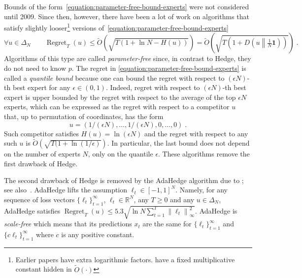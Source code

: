 \documentclass{colt2016} %
\DeclareMathOperator{\Regret}{Regret}
\newcommand{\R}{\mathbb{R}}     %
\newcommand{\KL}[2]{D\left({#1}\middle\|{#2}\right)}  %
\newcommand{\norm}[1]{\left\|{#1}\right\|}
\newcommand{\indicator}{\mathbf{1}}
\begin{document}
Bounds of the form~\eqref{equation:parameter-free-bound-experts} were not
considered until 2009. Since then, however, there have been a lot of work
\citep{Chaudhuri-Freund-Hsu-2009, Chernov-Vovk-2010, Koolen-van-Erven-2015,
Luo-Schapire-2014, Luo-Schapire-2015, Foster-Rakhlin-Sridharan-2015,
Orabona-Pal-2016-parameter-free} on algorithms that satisfy slightly
looser\footnote{Earlier papers have extra logarithmic factors.
\citet{Foster-Rakhlin-Sridharan-2015, Orabona-Pal-2016-parameter-free} have
a fixed multiplicative constant hidden in $\widetilde
O(\cdot)$} versions of~\eqref{equation:parameter-free-bound-experts}
\begin{equation}
\label{equation:parameter-free-bound-experts-2}
\forall u \in \Delta_N \qquad \Regret_T(u) \le \widetilde O(\sqrt{T (1 + \ln N - H(u))}) = \widetilde O\left(\sqrt{T \left(1 + \KL{u}{\tfrac{1}{N}\indicator} \right)} \right) \; .
\end{equation}
Algorithms of this type are called \emph{parameter-free} since, in contrast to
Hedge, they do not need to know $p$. The regret in
\eqref{equation:parameter-free-bound-experts} is called a \emph{quantile bound}
because one can bound the regret with respect to $(\epsilon N)$-th best expert
for any $\epsilon \in (0,1)$. Indeed, regret with respect to $(\epsilon N)$-th
best expert is upper bounded by the regret with respect to the average of the
top $\epsilon N$ experts, which can be expressed as the regret with respect to
a competitor $u$ that, up to permutation of coordinates, has the form
$$
u = \left( 1/(\epsilon N), \dots, 1/(\epsilon N), 0, \dots, 0 \right) \; .
$$
Such competitor satisfies $H(u) = \ln (\epsilon N)$ and the regret with respect
to any such $u$ is $\widetilde O(\sqrt{T (1 + \ln(1/\epsilon)})$. In
particular, the last bound does not depend on the number of experts $N$, only
on the quantile $\epsilon$.  These algorithms remove the first drawback of
Hedge.

The second drawback of Hedge is removed by the AdaHedge algorithm due to
\cite{de-Rooij-van-Erven-Grunwald-Koolen-2014}; see
also~\citep{Orabona-Pal-2016-parameter-free}. AdaHedge lifts the assumption
$\ell_t \in [-1,1]^N$. Namely, for any sequence of loss vectors
$\{\ell_t\}_{t=1}^\infty$, $\ell_t \in \R^N$, any $T \ge 0$ and any $u \in
\Delta_N$, AdaHedge satisfies $\Regret_T(u) \le 5.3 \sqrt{\ln N \sum_{t=1}^T
\norm{\ell_t}_\infty^2}$. AdaHedge is \emph{scale-free} which means that its
predictions $x_t$ are the same for $\{\ell_t\}_{t=1}^\infty$ and $\{c
\ell_t\}_{t=1}^\infty$ where $c$ is any positive constant.
\end{document}
